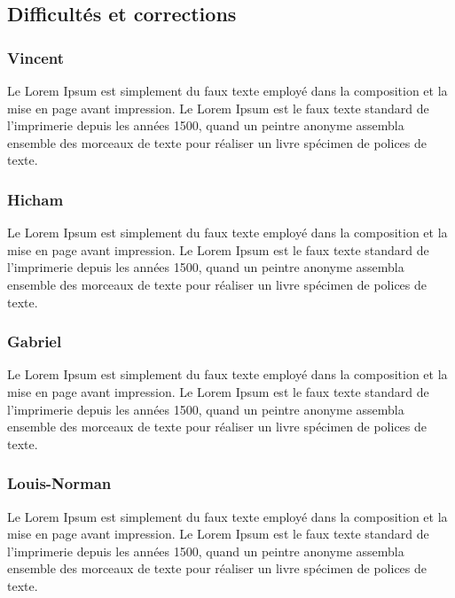 \begin{center}\HRule \end{center}

\subsection{Difficultés et corrections}
\begin{multicols}{4}
\subsubsection{Vincent}
Le Lorem Ipsum est simplement du faux texte employé dans la composition et la mise en page avant impression. Le Lorem Ipsum est le faux texte standard de l'imprimerie depuis les années 1500, quand un peintre anonyme assembla ensemble des morceaux de texte pour réaliser un livre spécimen de polices de texte.
\subsubsection{Hicham}
Le Lorem Ipsum est simplement du faux texte employé dans la composition et la mise en page avant impression. Le Lorem Ipsum est le faux texte standard de l'imprimerie depuis les années 1500, quand un peintre anonyme assembla ensemble des morceaux de texte pour réaliser un livre spécimen de polices de texte.
\subsubsection{Gabriel}
Le Lorem Ipsum est simplement du faux texte employé dans la composition et la mise en page avant impression. Le Lorem Ipsum est le faux texte standard de l'imprimerie depuis les années 1500, quand un peintre anonyme assembla ensemble des morceaux de texte pour réaliser un livre spécimen de polices de texte.
\subsubsection{Louis-Norman}
Le Lorem Ipsum est simplement du faux texte employé dans la composition et la mise en page avant impression. Le Lorem Ipsum est le faux texte standard de l'imprimerie depuis les années 1500, quand un peintre anonyme assembla ensemble des morceaux de texte pour réaliser un livre spécimen de polices de texte.
\end{multicols}

\pagebreak

